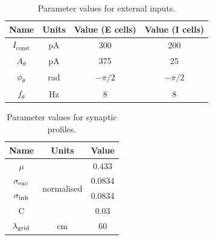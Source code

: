\documentclass[a4paper,12pt]{article}
\newcommand{\ssc}[3]{\ensuremath{#1_{\text{#2}_{\text{#3}}}}}
\newcommand{\Iconst}   {\ssc{I}      {const} {}}
\newcommand{\Atheta}   {\ssc{A}      {$\theta$}{}}
\newcommand{\ftheta}   {\ssc{f}      {$\theta$}{}}
\newcommand{\phitheta} {\ssc{\phi}   {$\theta$}{}}
\newcommand{\sigmasub}[1]{\ssc{\sigma}{\scriptsize{#1}}{}}
\newcommand{\lamgrid}{\ssc{\lambda}{\scriptsize{grid}}{}}
\begin{document}
\begin{table}
    \internallinenumbers
    \centering
    \begin{tabular}{| c | c | c | c |}
        \hline
        Name       & Units & Value (E cells) & Value (I cells) \\
        \hline\hline
        $\Iconst$  & pA    & 300             & 200             \\
        $\Atheta$  & pA    & 375             & 25              \\
        $\phitheta$& rad   & $-\pi/2$        & $-\pi/2$        \\
        $\ftheta$  & Hz    & 8               & 8               \\
        \hline
    \end{tabular}
    \caption{Parameter values for external inputs.}
\end{table}

\begin{table}
    \internallinenumbers
    \centering
    \begin{tabular}{| c | c | c |}
        \hline
        Name              & Units                        & Value   \\
        \hline\hline
        $\mu$             & \multirow{4}{*}{normalised}  & 0.433   \\
        $\sigmasub{exc}$  &                              & 0.0834  \\
        $\sigmasub{inh}$  &                              & 0.0834  \\
        C                 &                              & 0.03    \\
        \lamgrid          & cm                           & 60      \\
        \hline
    \end{tabular}
    \caption{Parameter values for synaptic profiles.}
    \label{tab:params_syn}
\end{table}

\clearpage





\clearpage


\setcounter{figure}{0}
\makeatletter
\renewcommand{\fnum@figure}[1]{\textbf{\figurename~\thefigure}}
\makeatother
\end{document}
